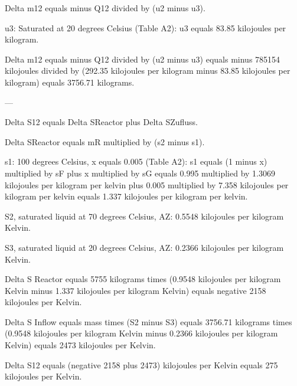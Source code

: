 Delta m12 equals minus Q12 divided by (u2 minus u3).  

u3:  
Saturated at 20 degrees Celsius (Table A2):  
u3 equals 83.85 kilojoules per kilogram.  

Delta m12 equals minus Q12 divided by (u2 minus u3)  
equals minus 785154 kilojoules divided by (292.35 kilojoules per kilogram minus 83.85 kilojoules per kilogram)  
equals 3756.71 kilograms.  

---

Delta S12 equals Delta SReactor plus Delta SZufluss.  

Delta SReactor equals mR multiplied by (s2 minus s1).  

s1:  
100 degrees Celsius, x equals 0.005 (Table A2):  
s1 equals (1 minus x) multiplied by sF plus x multiplied by sG  
equals 0.995 multiplied by 1.3069 kilojoules per kilogram per kelvin plus 0.005 multiplied by 7.358 kilojoules per kilogram per kelvin  
equals 1.337 kilojoules per kilogram per kelvin.

S2, saturated liquid at 70 degrees Celsius, AZ: 0.5548 kilojoules per kilogram Kelvin.  

S3, saturated liquid at 20 degrees Celsius, AZ: 0.2366 kilojoules per kilogram Kelvin.  

Delta S Reactor equals 5755 kilograms times (0.9548 kilojoules per kilogram Kelvin minus 1.337 kilojoules per kilogram Kelvin) equals negative 2158 kilojoules per Kelvin.  

Delta S Inflow equals mass times (S2 minus S3) equals 3756.71 kilograms times (0.9548 kilojoules per kilogram Kelvin minus 0.2366 kilojoules per kilogram Kelvin) equals 2473 kilojoules per Kelvin.  

Delta S12 equals (negative 2158 plus 2473) kilojoules per Kelvin equals 275 kilojoules per Kelvin.